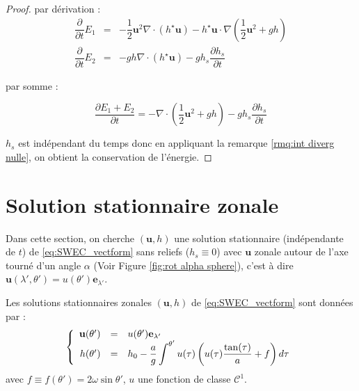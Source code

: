 \begin{proof}
par dérivation :
\begin{equation}
\begin{array}{rcl}
\dfrac{\partial}{\partial t} E_1 & = & -\dfrac{1}{2} \mathbf{u}^2 \nabla \cdot \left( h^{\star} \mathbf{u} \right) - h^{\star} \mathbf{u} \cdot \nabla \left( \dfrac{1}{2} \mathbf{u}^2 + gh \right) \\
\dfrac{\partial}{\partial t} E_2 & = & - gh \nabla \cdot \left( h^{\star} \mathbf{u} \right) - g h_s \dfrac{\partial h_s}{\partial t} 
\end{array}
\end{equation}

par somme :

$$
\dfrac{\partial E_1 + E_2}{\partial t} = - \nabla \cdot \left( \dfrac{1}{2} \mathbf{u}^2 + gh \right) - g h_s \dfrac{\partial h_s}{\partial t} 
$$

$h_s$ est indépendant du temps donc en appliquant la remarque \ref{rmq:int diverg nulle}, on obtient la conservation de l'énergie.
\end{proof}

\section{Solution stationnaire zonale}

Dans cette section, on cherche $(\mathbf{u},h)$ une solution stationnaire (indépendante de $t$) de \eqref{eq:SWEC_vectform} sans reliefs ($h_s \equiv 0$) avec $\mathbf{u}$ zonale autour de l'axe tourné d'un angle $\alpha$ (Voir Figure \ref{fig:rot alpha sphere}), c'est à dire $\mathbf{u}(\lambda', \theta') = u(\theta') \mathbf{e}_{\lambda'}$.

\begin{proposition}
Les solutions stationnaires zonales $(\mathbf{u},h)$ de \eqref{eq:SWEC_vectform} sont données par :
\begin{equation}
\left\lbrace
\begin{array}{rcl}
\mathbf{u}(\theta') & = & u(\theta') \mathbf{e}_{\lambda'}\\
h(\theta') & = & h_0 - \dfrac{a}{g} \displaystyle\int^{\theta'} u(\tau) \left( u(\tau) \dfrac{\tan (\tau)}{a} + f \right) d\tau\\
\end{array}
\right.
\label{eq:sol. stationaire zonale de swe}
\end{equation}
avec $f \equiv f(\theta') = 2 \omega \sin \theta'$, $u$ une fonction de classe $\mathcal{C}^1$.
\end{proposition}

